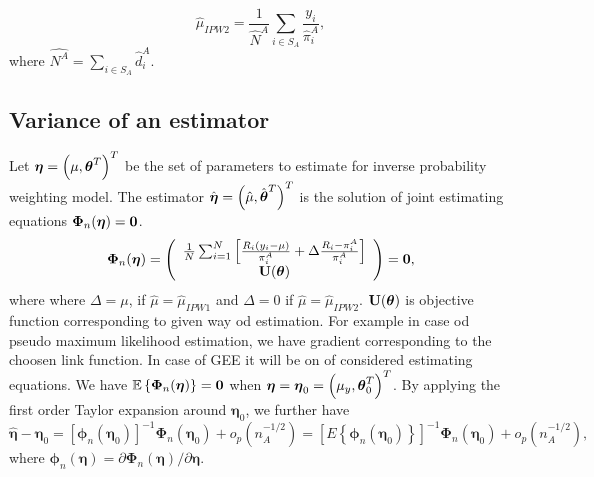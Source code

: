 \documentclass[
  letterpaper,
  DIV=11,
  numbers=noendperiod]{scrreprt}
\begin{document}
\[
\begin{equation*}
    \hat{\mu}_{IPW2} = \frac{1}{\hat{N}^{A}} \sum_{i \in S_A} \frac{y_i}{\hat{\pi}_i^{A}},
\end{equation*}
\] where \(\hat{N^A} = \sum_{i \in S_A} \hat{d}_i^A\).

\hypertarget{variance-of-an-estimator}{%
\subsection{Variance of an estimator}\label{variance-of-an-estimator}}

Let \(\boldsymbol{\eta} = \left(\mu, \boldsymbol{\theta}^{T}\right)^{T}\) be the set
of parameters to estimate for inverse probability weighting model. The
estimator
\(\hat{\boldsymbol{\eta}} = \left(\hat{\mu}, \hat{\boldsymbol{\theta}}^{T}\right)^{T}\)
is the solution of joint estimating equations
\(\boldsymbol{\Phi}_n(\boldsymbol{\eta}) = \boldsymbol{0}\). \[
\begin{equation}
\boldsymbol{\Phi}_n(\boldsymbol{\eta})=\left(\begin{array}{c}
\frac{1}{N} \sum_{i=1}^N\left[\frac{R_i\left(y_i-\mu\right)}{\pi_i^A}+\Delta \frac{R_i-\pi_i^A}{\pi_i^A}\right] \\
\mathbf{U}(\btheta)
\end{array}\right)=\bZero,
\end{equation}
\] where where \(\Delta = \mu\), if \(\hat{\mu} = \hat{\mu}_{IPW1}\) and
\(\Delta = 0\) if \(\hat{\mu} = \hat{\mu}_{IPW2}\).
\(\mathbf{U}(\boldsymbol{\theta})\) is objective function corresponding to given way
od estimation. For example in case od pseudo maximum likelihood
estimation, we have gradient corresponding to the choosen link function.
In case of GEE it will be on of considered estimating equations. We have
\(\mathbb{E} \left\{\boldsymbol{\Phi}_n(\boldsymbol{\eta})\right\} = \boldsymbol{0}\)
when
\(\boldsymbol{\eta} = \boldsymbol{\eta}_{0} = \left(\mu_y, \boldsymbol{\theta}_0^{T}\right)^{T}\).
By applying the first order Taylor expansion around
\(\boldsymbol{\eta}_0\), we further have \[
\begin{equation*}
\hat{\boldsymbol{\eta}}-\boldsymbol{\eta}_0=\left[\boldsymbol{\phi}_n\left(\boldsymbol{\eta}_0\right)\right]^{-1} \boldsymbol{\Phi}_n\left(\boldsymbol{\eta}_0\right)+o_p\left(n_A^{-1 / 2}\right)=\left[E\left\{\boldsymbol{\phi}_n\left(\boldsymbol{\eta}_0\right)\right\}\right]^{-1} \boldsymbol{\Phi}_n\left(\boldsymbol{\eta}_0\right)+o_p\left(n_A^{-1 / 2}\right),
\end{equation*}
\] where
\(\boldsymbol{\phi}_n(\boldsymbol{\eta})=\partial \boldsymbol{\Phi}_n(\boldsymbol{\eta}) / \partial \boldsymbol{\eta}\).
\end{document}
